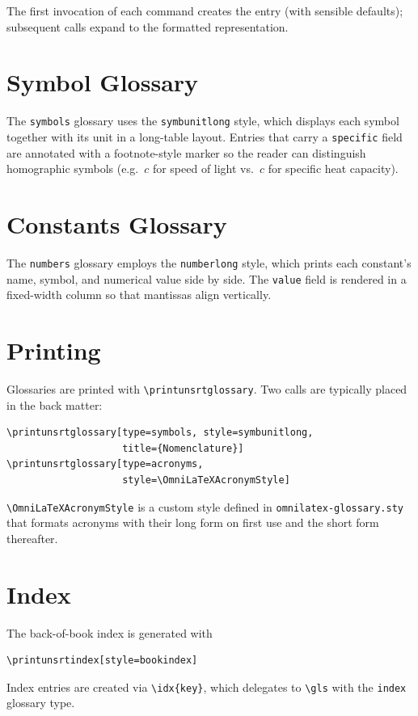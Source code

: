 The first invocation of each command creates the entry (with sensible
defaults); subsequent calls expand to the formatted representation.

\section{Symbol Glossary}

The \texttt{symbols} glossary uses the \texttt{symbunitlong} style, which
displays each symbol together with its unit in a long-table layout.
Entries that carry a \texttt{specific} field are annotated with a
footnote-style marker so the reader can distinguish homographic symbols
(e.g.\ $c$ for speed of light vs.\ $c$ for specific heat capacity).

\section{Constants Glossary}

The \texttt{numbers} glossary employs the \texttt{numberlong} style,
which prints each constant's name, symbol, and numerical value side by
side.  The \texttt{value} field is rendered in a fixed-width column so
that mantissas align vertically.

\section{Printing}

Glossaries are printed with \texttt{\textbackslash printunsrtglossary}.
Two calls are typically placed in the back matter:

\begin{verbatim}
\printunsrtglossary[type=symbols, style=symbunitlong,
                    title={Nomenclature}]
\printunsrtglossary[type=acronyms,
                    style=\OmniLaTeXAcronymStyle]
\end{verbatim}

\texttt{\textbackslash OmniLaTeXAcronymStyle} is a custom style defined
in \texttt{omnilatex-glossary.sty} that formats acronyms with their long
form on first use and the short form thereafter.

\section{Index}

The back-of-book index is generated with

\begin{verbatim}
\printunsrtindex[style=bookindex]
\end{verbatim}

Index entries are created via \verb|\idx{key}|, which delegates to
\texttt{\textbackslash gls} with the \texttt{index} glossary type.
